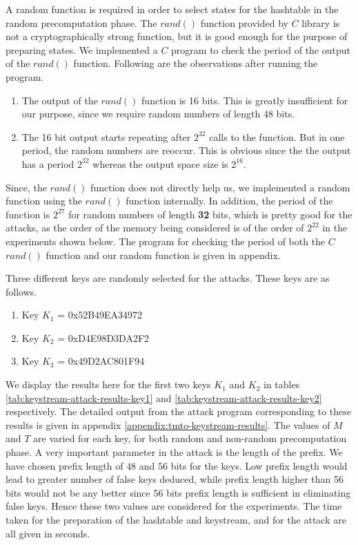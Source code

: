 A random function is required in order to select states for the hashtable in the random precomputation phase. The $rand()$ function provided by $C$ library is not a cryptographically strong function, but it is good enough for the purpose of preparing states. We implemented a $C$ program to check the period of the output of the $rand()$ function. Following are the observations after running the program.

\begin{enumerate}
\item The output of the $rand()$ function is 16 bits. This is greatly insufficient for our purpose, since we require random numbers of length 48 bits. 
\item The 16 bit output starts repeating after $2^{32}$ calls to the function. But in one period, the random numbers are reoccur. This is obvious since the the output has a period $2^{32}$ whereas the output space size is $2^{16}$. 
\end{enumerate}

Since, the $rand()$ function does not directly help us, we implemented a random function using the $rand()$ function internally. In addition, the period of the function is $2^{27}$ for random numbers of length \textbf{32} bits, which is pretty good for the attacks, as the order of the memory being considered is of the order of $2^{22}$ in the experiments shown below. The program for checking the period of both the $C$ $rand()$ function and our random function is given in appendix.

Three different keys are randomly selected for the attacks. These keys are as follows.

\begin{enumerate}
\item Key $K_1$ = 0x52B49EA34972
\item Key $K_2$ = 0xD4E98D3DA2F2
\item Key $K_3$ = 0x49D2AC801F94
\end{enumerate}

We display the results here for the first two keys $K_1$ and $K_2$ in tables \ref{tab:keystream-attack-results-key1} and \ref{tab:keystream-attack-results-key2} respectively. The detailed output from the attack program corresponding to these results is given in appendix \ref{appendix:tmto-keystream-results}. The values of $M$ and $T$ are varied for each key, for both random and non-random precomputation phase. A very important parameter in the attack is the length of the prefix. We have chosen prefix length of $48$ and $56$ bits for the keys. Low prefix length would lead to greater number of false keys deduced, while prefix length higher than 56 bits would not be any better since 56 bits prefix length is sufficient in eliminating false keys. Hence these two values are considered for the experiments. The time taken for the preparation of the hashtable and keystream, and for the attack are all given in seconds. 

